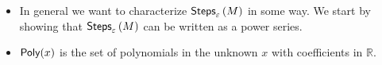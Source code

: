 \begin{itemize}
	\item
	In general we want to characterize $\textsf{Steps}_{\varepsilon}\left(M\right)$ in some way. We start by showing that $\textsf{Steps}_{\varepsilon}\left(M\right)$ can be written as a power series.
	\item
	$\textsf{Poly}(x)$ is the set of polynomials in the unknown $x$ with coefficients in $\mathbb{R}$.
\end{itemize}
